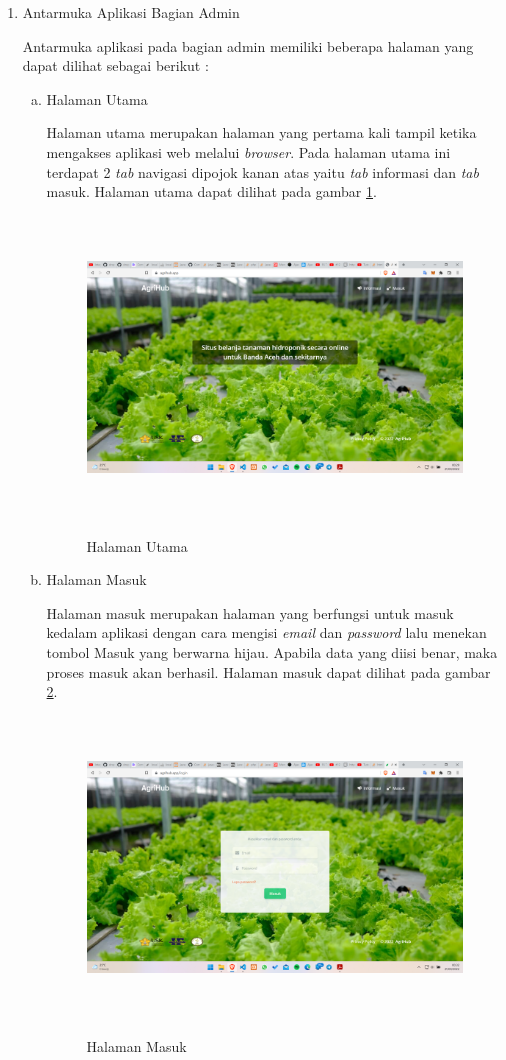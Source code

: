 \begin{enumerate}
	\item Antarmuka Aplikasi Bagian Admin
	
	Antarmuka aplikasi pada bagian admin memiliki beberapa halaman yang dapat dilihat sebagai berikut :

	\begin{enumerate}[a.]
		\item Halaman Utama
		\par Halaman utama merupakan halaman yang pertama kali tampil ketika mengakses aplikasi web melalui \textit{browser}. Pada halaman utama ini terdapat 2 \textit{tab} navigasi dipojok kanan atas yaitu \textit{tab} informasi dan \textit{tab} masuk. Halaman utama dapat dilihat pada gambar \ref*{homepage}.
		\begin{figure}[H]
			\centering
			{\includegraphics [width = 13.3cm, height= 8cm]{gambar/homepage}}
			\caption{Halaman Utama}
			\label{homepage}
		\end{figure}

		\item Halaman Masuk
		\par Halaman masuk merupakan halaman yang berfungsi untuk masuk kedalam aplikasi dengan cara mengisi \textit{email} dan \textit{password} lalu menekan tombol Masuk yang berwarna hijau. Apabila data yang diisi benar, maka proses masuk akan berhasil. Halaman masuk dapat dilihat pada gambar \ref*{login}.
		\begin{figure}[H]
			\centering
			{\includegraphics [width = 13.3cm, height= 8cm]{gambar/login}}
			\caption{Halaman Masuk}
			\label{login}
		\end{figure}
	

\end{enumerate}
\end{enumerate}
